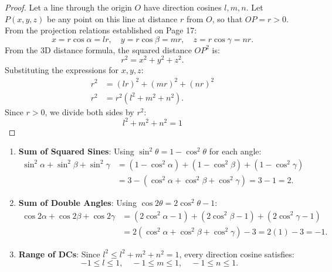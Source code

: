 \begin{proof}
Let a line through the origin $O$ have direction cosines $l, m, n$.
Let $P(x, y, z)$ be any point on this line at distance $r$ from $O$, so that $OP = r > 0$.
From the projection relations established on Page 17:
\begin{equation}
    x = r\cos\alpha = lr, \quad y = r\cos\beta = mr, \quad z = r\cos\gamma = nr.
\end{equation}
From the 3D distance formula, the squared distance $OP^2$ is:
\begin{equation}
    r^2 = x^2 + y^2 + z^2.
\end{equation}
Substituting the expressions for $x, y, z$:
\begin{align}
    r^2 &= (lr)^2 + (mr)^2 + (nr)^2 \nonumber\\
    r^2 &= r^2(l^2 + m^2 + n^2).
\end{align}
Since $r > 0$, we divide both sides by $r^2$:
\begin{equation}
    \boxed{l^2 + m^2 + n^2 = 1}
\end{equation}
\end{proof}

\begin{notebox}
\begin{enumerate}
    \item \textbf{Sum of Squared Sines}:
    Using $\sin^2\theta = 1 - \cos^2\theta$ for each angle:
    \begin{align}
        \sin^2\alpha + \sin^2\beta + \sin^2\gamma &= (1 - \cos^2\alpha) + (1 - \cos^2\beta) + (1 - \cos^2\gamma) \nonumber\\
        &= 3 - (\cos^2\alpha + \cos^2\beta + \cos^2\gamma) = 3 - 1 = \boxed{2}.
    \end{align}
    \item \textbf{Sum of Double Angles}:
    Using $\cos 2\theta = 2\cos^2\theta - 1$:
    \begin{align}
        \cos 2\alpha + \cos 2\beta + \cos 2\gamma &= (2\cos^2\alpha - 1) + (2\cos^2\beta - 1) + (2\cos^2\gamma - 1) \nonumber\\
        &= 2(\cos^2\alpha + \cos^2\beta + \cos^2\gamma) - 3 = 2(1) - 3 = \boxed{-1}.
    \end{align}
    \item \textbf{Range of DCs}: Since $l^2 \le l^2+m^2+n^2=1$, every direction cosine satisfies:
    \begin{equation}
        -1 \le l \le 1, \quad -1 \le m \le 1, \quad -1 \le n \le 1.
    \end{equation}
\end{enumerate}
\end{notebox}

